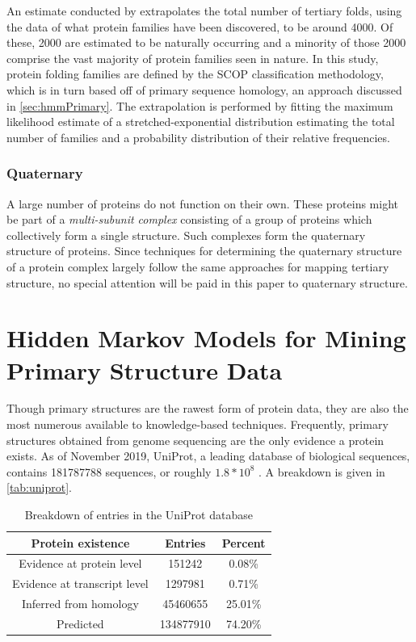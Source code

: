 \documentclass{article}
\begin{document}
An estimate conducted by \cite{numberOfFolds} extrapolates the total number of tertiary folds, using the data of what protein families have been discovered, to be around 4000. Of these, 2000 are estimated to be naturally occurring and a minority of those 2000 comprise the vast majority of protein families seen in nature. In this study, protein folding families are defined by the SCOP classification methodology, which is in turn based off of primary sequence homology, an approach discussed in \autoref{sec:hmmPrimary}. The extrapolation is performed by fitting the maximum likelihood estimate of a stretched-exponential distribution estimating the total number of families and a probability distribution of their relative frequencies.

\subsubsection{Quaternary}
A large number of proteins do not function on their own. These proteins might be part of a \textit{multi-subunit complex} consisting of a group of proteins which collectively form a single structure. Such complexes form the quaternary structure of proteins. Since techniques for determining the quaternary structure of a protein complex largely follow the same approaches for mapping tertiary structure, no special attention will be paid in this paper to quaternary structure.

\section{Hidden Markov Models for Mining Primary Structure Data} \label{sec:hmmPrimary}
Though primary structures are the rawest form of protein data, they are also the most numerous available to knowledge-based techniques. Frequently, primary structures obtained from genome sequencing are the only evidence a protein exists. As of November 2019, UniProt, a leading database of biological sequences, contains 181787788 sequences, or roughly $1.8 * 10^8$ \cite{uniprot}. A breakdown is given in \autoref{tab:uniprot}. 

\begin{table}[h!]
    \centering
       \begin{tabular}{|c||c||c|}
        \hline
        \hline
        Protein existence & Entries & Percent \\ \hline
        Evidence at protein level & 151242 & 0.08\% \\ \hline
        Evidence at transcript level & 1297981 & 0.71\% \\ \hline
        Inferred from homology & 45460655 & 25.01\% \\ \hline
        Predicted & 134877910 & 74.20\% \\ \hline
        \end{tabular}
    \caption{Breakdown of entries in the UniProt database}
    \label{tab:uniprot}
\end{table}
\end{document}
